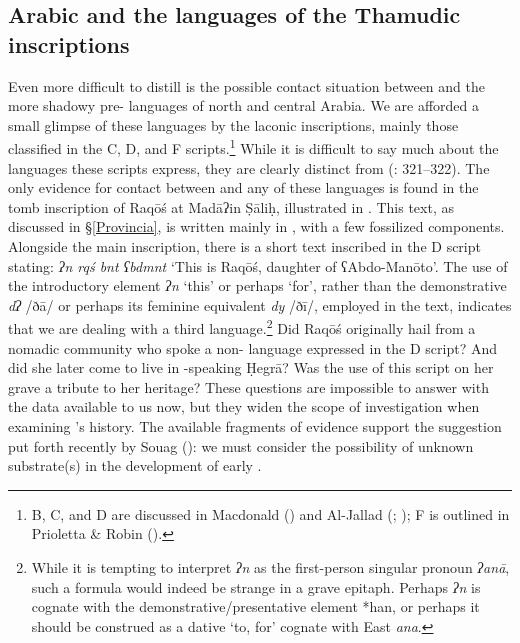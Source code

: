 \documentclass[output=paper]{langsci/langscibook}
\begin{document}
\subsection{Arabic and the languages of the Thamudic inscriptions}
Even more difficult to distill is the possible contact situation between  and the more shadowy pre-  languages of north and central Arabia. We are afforded a small glimpse of these languages by the laconic  inscriptions, mainly those classified in the C, D, and F scripts.\footnote{ B, C, and D are discussed in Macdonald (\citeyear{Macdonald2000}) and Al-Jallad (\citeyear{Al-Jallad2017early}; \citeyear{Al-Jallad2018ANA});  F is outlined in Prioletta \& Robin (\citeyear{PriolettaRobin2018}).}  While it is difficult to say much about the languages these scripts express, they are clearly distinct from  (\citealt{Al-Jallad2017early}: 321--322). The only evidence for contact between  and any of these languages is found in the tomb inscription of Raqōś at Madāʔin Ṣāliḥ, illustrated in . This text, as discussed in §\ref{Provincia}, is written mainly in , with a few fossilized  components. Alongside the main inscription, there is a short text inscribed in the  D script stating: \textit{ʔn rqś bnt ʕbdmnt} ‘This is Raqōś, daughter of ʕAbdo-Manōto’. The use of the introductory element \textit{ʔn} `this' or perhaps `for', rather than the  demonstrative \textit{dʔ} /ðā/ or perhaps its feminine equivalent \textit{dy} /ðī/, employed in the  text, indicates that we are dealing with a third language.\footnote{While it is tempting to interpret \textit{ʔn} as the first-person singular pronoun \textit{ʔanā}, such a formula would indeed be strange in a grave epitaph. Perhaps \textit{ʔn} is {cognate} with the demonstrative/presentative element *han, or perhaps it should be construed as a dative `to, for' {cognate} with East  \textit{ana}.} Did Raqōś originally hail from a nomadic community who spoke a non-  language expressed in the  D script? And did she later come to live in -speaking Ḥegrā? Was the use of this script on her grave a tribute to her heritage? These {questions} are impossible to answer with the data available to us now, but they widen the scope of investigation when examining ’s history. The available fragments of evidence support the suggestion put forth recently by Souag (\citeyear{Souag2018blog}): we must consider the possibility of unknown  {substrate}(s) in the development of early .
\end{document}
